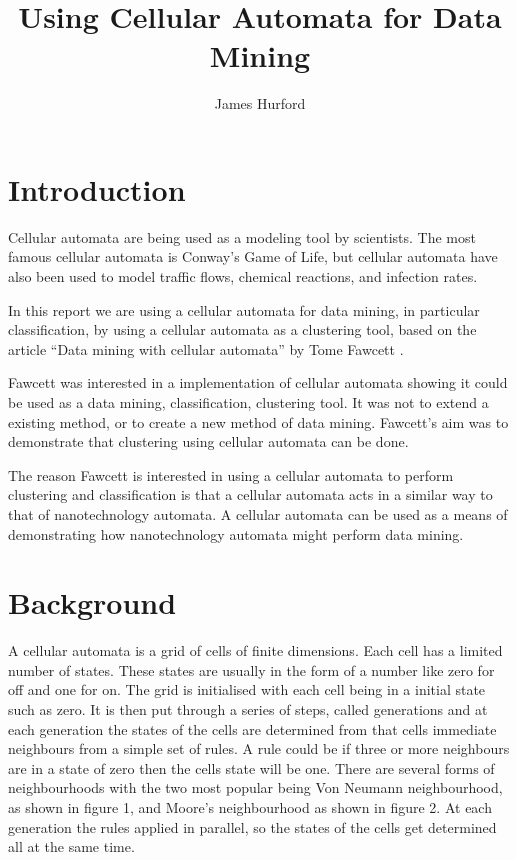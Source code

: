 \documentclass[11pt]{article}
\title{Using Cellular Automata for Data Mining}
\author{James Hurford}
\date{}
\begin{document}
\maketitle

\setcounter{tocdepth}{3}
\tableofcontents
\vspace*{1cm}






\section{Introduction}
\label{sec-1}


  Cellular automata are being used as a modeling tool by
  scientists. The most famous cellular automata is Conway's Game of
  Life, but cellular automata have also been used to model traffic
  flows, chemical reactions, and infection rates.

  In this report we are using a cellular automata for data mining, in
  particular classification, by using a cellular automata as a
  clustering tool, based on the article ``Data mining with cellular
  automata'' by Tome Fawcett \cite{fawcett08}.

  Fawcett \cite{fawcett08} was interested in a implementation of
  cellular automata showing it could be used as a data mining,
  classification, clustering tool.  It was not to extend a existing
  method, or to create a new method of data mining. Fawcett's
  \cite{fawcett08} aim was to demonstrate that clustering using
  cellular automata can be done.

  The reason Fawcett \cite{fawcett08} is interested in using a
  cellular automata to perform clustering and classification is that a
  cellular automata acts in a similar way to that of nanotechnology
  automata. A cellular automata can be used as a means of
  demonstrating how nanotechnology automata might perform data mining.
\section{Background}
\label{sec-2}

  A cellular automata is a grid of cells of finite dimensions.  Each
  cell has a limited number of states.  These states are usually in
  the form of a number like zero for off and one for on.  The grid is
  initialised with each cell being in a initial state such as zero.
  It is then put through a series of steps, called generations and at
  each generation the states of the cells are determined from that
  cells immediate neighbours from a simple set of rules.  A rule could
  be if three or more neighbours are in a state of zero then the cells
  state will be one.  There are several forms of neighbourhoods with
  the two most popular being Von Neumann neighbourhood, as shown in
  figure 1, and Moore's neighbourhood as shown in figure 2. At each
  generation the rules applied in parallel, so the states of the cells
  get determined all at the same time.
\end{document}
